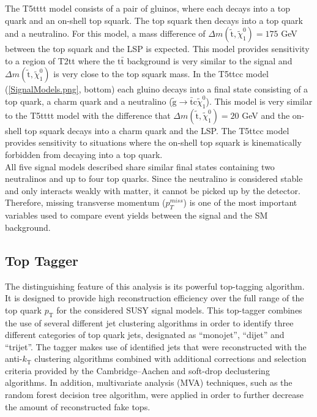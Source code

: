 The T5tttt model consists of a pair of gluinos, where each decays into a top quark and an on-shell top squark. The top squark then decays into a top quark and a neutralino. For this model, a mass difference of $\Delta m(\tilde{\text{t}},\tilde{\chi}_{1}^{0}) = 175$ GeV between the top squark and the LSP is expected. This model provides sensitivity to a region of T2tt where the t$\bar{\text{t}}$ background is very similar to the signal and $\Delta m(\tilde{\text{t}},\tilde{\chi}_{1}^{0})$ is very close to the top squark mass. In the T5ttcc model (\autoref{SignalModels.png}, bottom) each gluino decays into a final state consisting of a top quark, a charm quark and a neutralino ($\tilde{\text{g}}\rightarrow\bar{\text{t}}\text{c}\tilde{\chi}_{1}^{0}$). This model is very similar to the T5tttt model with the difference that $\Delta m(\tilde{\text{t}},\tilde{\chi}_{1}^{0}) = 20$ GeV and the on-shell top squark decays into a charm quark and the LSP. The T5ttcc model provides sensitivity to situations where the on-shell top squark is kinematically forbidden from decaying into a top quark.\\

All five signal models described share similar final states containing two neutralinos and up to four top quarks. Since the neutralino is considered stable and only interacts weakly with matter, it cannot be picked up by the detector. Therefore, missing transverse momentum ($p_{T}^{miss}$) is one of the most important variables used to compare event yields between the signal and the SM background.

\subsection{Top Tagger}\label{TopTaggerSec}

The distinguishing feature of this analysis is its powerful top-tagging algorithm. It is designed to provide high reconstruction efficiency over the full range of the top quark $p_\text{T}$ for the considered SUSY signal models. This top-tagger combines the use of several different jet clustering algorithms in order to identify three different categories of top quark jets, designated as ``monojet'', ``dijet'' and ``trijet''. The tagger makes use of identified jets that were reconstructed with the anti-$k_\text{T}$\cite{AntiKt} clustering algorithms combined with additional corrections and selection criteria provided by the Cambridge--Aachen\cite{JetAlg1} and soft-drop declustering\cite{SoftDrop} algorithms. In addition, multivariate analysis (MVA) techniques, such as the random forest decision tree algorithm\cite{RandForest1}, were applied in order to further decrease the amount of reconstructed fake tops.\\

